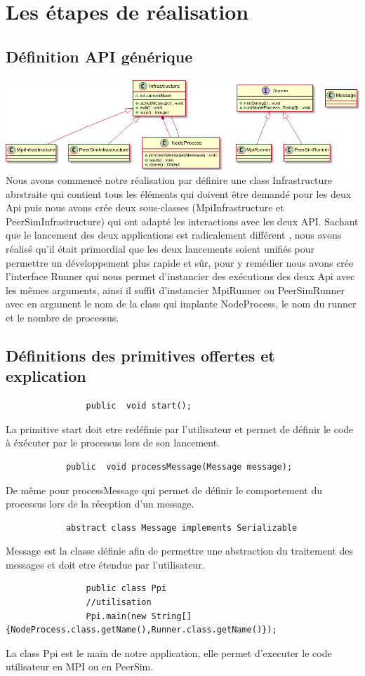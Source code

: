 \documentclass{article}
\begin{document}
		\section{Les étapes de réalisation}
			\subsection{Définition API générique}
			\hspace*{-2cm} \includegraphics[width=19cm]{Ppi_uml.png}
			Nous avons commencé notre réalisation par définire une class Infrastructure abrstraite qui contient tous les éléments qui doivent être demandé pour les deux Api
			puis nous avons crée deux sous-classes (MpiInfrastructure et PeerSimInfrastructure) qui ont adapté les interactions avec les deux API.
			\newline
			Sachant que le lancement des deux applications est radicalement différent 
			, nous avons réalisé qu'il était primordial que les deux 
			lancements soient unifiés pour permettre un développement plus rapide et sûr, pour y remédier nous avons crée l'interface Runner qui nous permet 
			d'instancier des exécutions des deux Api avec les mêmes arguments, ainsi il suffit d'instancier MpiRunner ou PeerSimRunner avec en argument
			le nom de la class qui implante NodeProcess, le nom du runner et le nombre de processus.
			\subsection{Définitions des primitives offertes et explication}
			\begin{lstlisting}
				public  void start();
			\end{lstlisting}
			La primitive start  doit etre redéfinie par l'utilisateur et permet de définir le code à éxécuter par le processus lors de son lancement.
			\begin{lstlisting}
			public  void processMessage(Message message);
			\end{lstlisting}
			De même pour processMessage qui permet  de définir le comportement du processus lors de la réception d'un message.
			\begin{lstlisting}
			abstract class Message implements Serializable
			\end{lstlisting}
			Message est la classe définie afin de permettre une abstraction du traitement des messages et doit etre étendue par l'utilisateur.
			\newpage
			\begin{lstlisting}
				public class Ppi
				//utilisation
				Ppi.main(new String[] {NodeProcess.class.getName(),Runner.class.getName()});
			\end{lstlisting}
			La class Ppi est le main de notre application, elle permet d'executer le code utilisateur en MPI ou en PeerSim.
\end{document}
